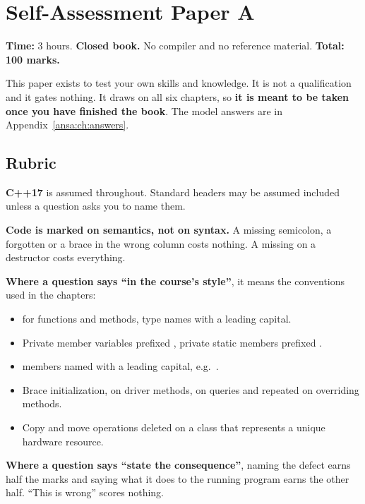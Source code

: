 
\chapter{Self-Assessment Paper A}
\label{exa:ch:paper}

\noindent\textbf{Time:} 3 hours. \textbf{Closed book.} No compiler and no reference material.
\textbf{Total: 100 marks.}

This paper exists to test your own skills and knowledge. It is not a qualification and it gates
nothing. It draws on all six chapters, so \textbf{it is meant to be taken once you have finished
the book}. The model answers are in Appendix~\ref{ansa:ch:answers}.

\section*{Rubric}
\textbf{C++17} is assumed throughout. Standard headers may be assumed included unless a question asks
you to name them.

\textbf{Code is marked on semantics, not on syntax.} A missing semicolon, a forgotten
 or a brace in the wrong column costs nothing. A missing  on a
destructor costs everything.

\textbf{Where a question says ``in the course's style''}, it means the conventions used in the
chapters:
\begin{itemize}
  \item {} for functions and methods, type names with a leading capital.
  \item Private member variables prefixed , private static members prefixed .
  \item {} members named with a leading capital, e.g.\ .
  \item Brace initialization,  on driver methods, \code{[[nodiscard]]} on queries and
    repeated on overriding methods.
  \item Copy and move operations deleted on a class that represents a unique hardware resource.
\end{itemize}

\textbf{Where a question says ``state the consequence''}, naming the defect earns half the marks and
saying what it does to the running program earns the other half. ``This is wrong'' scores nothing.

